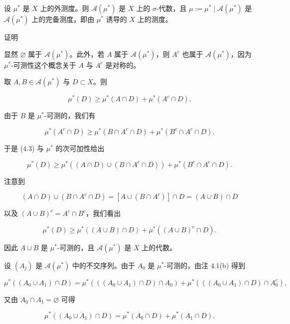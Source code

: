 \begin{theorem}

设 $ \mu^* $ 是 $ X $ 上的外测度。则 $ \mathcal{A}(\mu^*) $ 是 $ X $ 上的 $ \sigma $-代数，且 $ \mu := \mu^* \mid \mathcal{A}(\mu^*) $ 是 $ \mathcal{A}(\mu^*) $ 上的完备测度，即由 $ \mu^* $ 诱导的 $ X $ 上的测度。

证明

\begin{subitems}
\item

显然 $ \varnothing $ 属于 $ \mathcal{A}(\mu^*) $。此外，若 $ A $ 属于 $ \mathcal{A}(\mu^*) $，则 $ A^c $ 也属于 $ \mathcal{A}(\mu^*) $，因为 $ \mu^* $-可测性这个概念关于 $ A $ 与 $ A^c $ 是对称的。

\item

取 $ A, B \in \mathcal{A}(\mu^*) $ 与 $ D \subset X $。则

\begin{equation}
\mu^*(D) \ge \mu^*(A \cap D) + \mu^*(A^c \cap D) .\tag{4.3}
\end{equation}

由于 $ B $ 是 $ \mu^* $-可测的，我们有

\[
\mu^*(A^c \cap D) \ge \mu^*(B \cap A^c \cap D) + \mu^*(B^c \cap A^c \cap D) .
\]

于是 (4.3) 与 $ \mu^* $ 的次可加性给出

\[
\mu^*(D) \ge \mu^*((A \cap D) \cup (B \cap A^c \cap D)) + \mu^*(B^c \cap A^c \cap D) .
\]

注意到

\[
(A \cap D) \cup (B \cap A^c \cap D) = [A \cup (B \cap A^c)] \cap D = (A \cup B) \cap D
\]

以及 $ (A \cup B)^c = A^c \cap B^c $，我们看出

\[
\mu^*(D) \ge \mu^*((A \cup B) \cap D) + \mu^*((A \cup B)^c \cap D) .
\]

因此 $ A \cup B $ 是 $ \mu^* $-可测的，且 $ \mathcal{A}(\mu^*) $ 是 $ X $ 上的代数。

\item

设 $ (A_j) $ 是 $ \mathcal{A}(\mu^*) $ 中的不交序列。由于 $ A_0 $ 是 $ \mu^* $-可测的，由注 4.1(b) 得到

\[
\mu^*((A_0 \cup A_1) \cap D) = \mu^*(((A_0 \cup A_1) \cap D) \cap A_0) + \mu^*(((A_0 \cup A_1) \cap D) \cap A_0^c) ,
\]

又由 $ A_0 \cap A_1 = \varnothing $ 可得

\[
\mu^*((A_0 \cup A_1) \cap D) = \mu^*(A_0 \cap D) + \mu^*(A_1 \cap D) .
\]


\end{subitems}
\end{theorem}

